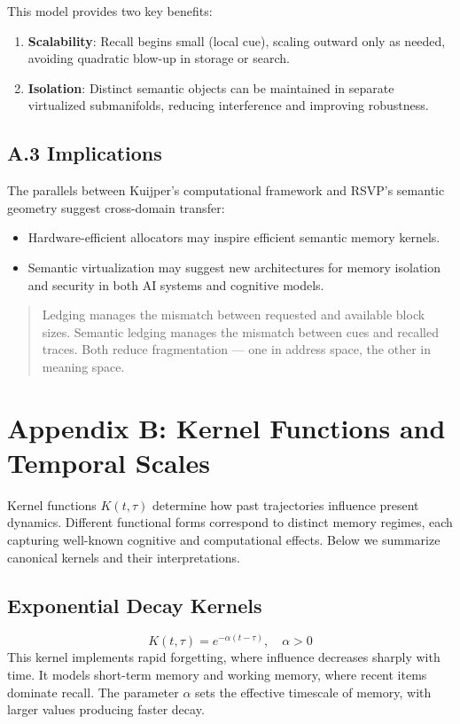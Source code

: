 \documentclass[a4paper,12pt]{article}
\begin{document}
This model provides two key benefits:
\begin{enumerate}
    \item \textbf{Scalability}: Recall begins small (local cue), scaling outward only as needed, 
          avoiding quadratic blow-up in storage or search.
    \item \textbf{Isolation}: Distinct semantic objects can be maintained in separate virtualized submanifolds, 
          reducing interference and improving robustness.
\end{enumerate}

\subsection*{A.3 Implications}
The parallels between Kuijper’s computational framework and RSVP’s semantic geometry
suggest cross-domain transfer:
\begin{itemize}
    \item Hardware-efficient allocators may inspire efficient semantic memory kernels.
    \item Semantic virtualization may suggest new architectures for memory isolation and 
          security in both AI systems and cognitive models.
\end{itemize}

\begin{quote}
Ledging manages the mismatch between requested and available block sizes.  
Semantic ledging manages the mismatch between cues and recalled traces.  
Both reduce fragmentation — one in address space, the other in meaning space.
\end{quote}

\appendix
\section*{Appendix B: Kernel Functions and Temporal Scales}

Kernel functions $K(t,\tau)$ determine how past trajectories influence present 
dynamics. Different functional forms correspond to distinct memory regimes, each 
capturing well-known cognitive and computational effects. Below we summarize 
canonical kernels and their interpretations.

\subsection*{Exponential Decay Kernels}
\[
K(t,\tau) = e^{-\alpha (t-\tau)}, \quad \alpha > 0
\]
This kernel implements rapid forgetting, where influence decreases sharply with 
time. It models short-term memory and working memory, where recent items dominate 
recall. The parameter $\alpha$ sets the effective timescale of memory, with larger 
values producing faster decay.
\end{document}

